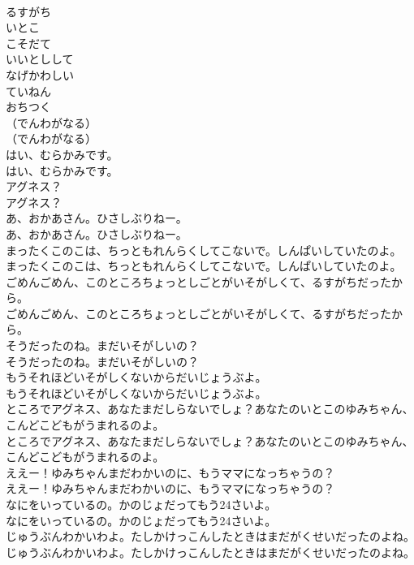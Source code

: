 \documentclass[8pt]{extreport}
\begin{document}
\begin{CJK}{UTF8}{min}
\\	るすがち
\\	いとこ
\\	こそだて
\\	いいとしして
\\	なげかわしい
\\	ていねん
\\	おちつく
\\	（でんわがなる）	
\\	（でんわがなる） 
\\	はい、むらかみです。	
\\	はい、むらかみです。 
\\	アグネス？	
\\	アグネス？ 
\\	あ、おかあさん。ひさしぶりねー。	
\\	あ、おかあさん。ひさしぶりねー。 
\\	まったくこのこは、ちっともれんらくしてこないで。しんぱいしていたのよ。	
\\	まったくこのこは、ちっともれんらくしてこないで。しんぱいしていたのよ。 
\\	ごめんごめん、このところちょっとしごとがいそがしくて、るすがちだったから。	
\\	ごめんごめん、このところちょっとしごとがいそがしくて、るすがちだったから。 
\\	そうだったのね。まだいそがしいの？	
\\	そうだったのね。まだいそがしいの？ 
\\	もうそれほどいそがしくないからだいじょうぶよ。	
\\	もうそれほどいそがしくないからだいじょうぶよ。 
\\	ところでアグネス、あなたまだしらないでしょ？あなたのいとこのゆみちゃん、こんどこどもがうまれるのよ。	
\\	ところでアグネス、あなたまだしらないでしょ？あなたのいとこのゆみちゃん、こんどこどもがうまれるのよ。 
\\	ええー！ゆみちゃんまだわかいのに、もうママになっちゃうの？	
\\	ええー！ゆみちゃんまだわかいのに、もうママになっちゃうの？ 
\\	なにをいっているの。かのじょだってもう24さいよ。	
\\	なにをいっているの。かのじょだってもう24さいよ。 
\\	じゅうぶんわかいわよ。たしかけっこんしたときはまだがくせいだったのよね。	
\\	じゅうぶんわかいわよ。たしかけっこんしたときはまだがくせいだったのよね。 

\end{CJK}
\end{document}
